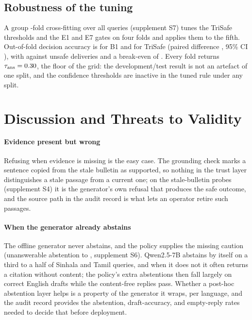 \subsection{Robustness of the tuning}\label{sec:cv}
A group \LCvFolds-fold cross-fitting over all \Lnq{} queries (supplement S7) tunes the TriSafe thresholds and the E1 and E7 gates on four folds and applies them to the fifth. Out-of-fold decision accuracy is \LCvBoneDec{} for B1 and \LCvTunDec{} for TriSafe (paired difference \LCvTunDeltaDec, 95\% CI \LCvTunDeltaDecCI), with \LCvBoneUnsafe{} against \LCvTunUnsafe{} unsafe deliveries and a break-even of \LCvTunBreakEven. Every fold returns $\tau_{\mathrm{ans}}=0.30$, the floor of the grid: the development/test result is not an artefact of one split, and the confidence thresholds are inactive in the tuned rule under any split.

\section{Discussion and Threats to Validity}\label{sec:discussion}
\paragraph{Evidence present but wrong} Refusing when evidence is missing is the easy case. The grounding check marks a sentence copied from the stale bulletin as supported, so nothing in the trust layer distinguishes a stale passage from a current one; on the stale-bulletin probes (supplement S4) it is the generator's own refusal that produces the safe outcome, and the source path in the audit record is what lets an operator retire such passages.

\paragraph{When the generator already abstains} The offline generator never abstains, and the policy supplies the missing caution (unanswerable abstention \OBoneUnans{} to \OTunUnans, supplement S6). Qwen2.5-7B abstains by itself on a third to a half of Sinhala and Tamil queries, and when it does not it often returns a citation without content; the policy's extra abstentions then fall largely on correct English drafts while the content-free replies pass. Whether a post-hoc abstention layer helps is a property of the generator it wraps, per language, and the audit record provides the abstention, draft-accuracy, and empty-reply rates needed to decide that before deployment.

